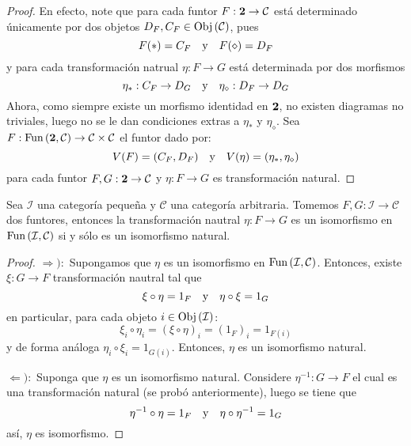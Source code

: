 \documentclass[12pt]{report}
\newcounter{it}
\theoremstyle{largebreak}
\newcommand\cf[3]{\ensuremath{#1:#2\rightarrow#3}}
\newcommand{\Obj}[1]{\ensuremath{\textup{Obj}\left(#1\right)}}
\newcommand{\Cat}[1]{\ensuremath{\textup{\textbf{#1}}}}
\newcommand{\Fun}[2]{\ensuremath{\textup{Fun}\left(#1,#2\right)}}
\begin{document}
    \begin{proof}
        En efecto, note que para cada funtor $\cf{F}{\Cat{2}}{\mathcal{C}}$ está determinado únicamente por dos objetos $D_F, C_F\in\Obj{\mathcal{C}}$, pues
        \begin{equation*}
            F(*)=C_F\quad\textup{y}\quad F(\diamond)=D_F
        \end{equation*}
        y para cada transformación natrual $\cf{\eta}{F}{G}$ está determinada por dos morfismos
        \begin{equation*}
            \cf{\eta_*}{C_F}{D_G}\quad\textup{y}\quad\cf{\eta_\diamond}{D_F}{D_G}
        \end{equation*}
        Ahora, como siempre existe un morfismo identidad en $\Cat{2}$, no existen diagramas no triviales, luego no se le dan condiciones extras a $\eta_*$ y $\eta_\diamond$. Sea $\cf{F}{\Fun{\Cat{2}}{\mathcal{C}}}{\mathcal{C}\times\mathcal{C}}$ el funtor dado por:
        \begin{equation*}
            V(F)=(C_F,D_F)\quad\textup{y}\quad V(\eta)=(\eta_*,\eta_\diamond)
        \end{equation*}
        para cada funtor $\cf{F,G}{\Cat{2}}{\mathcal{C}}$ y $\cf{\eta}{F}{G}$ es transformación natural.
    \end{proof}

    \begin{propo}
        Sea $\mathcal{I}$ una categoría pequeña y $\mathcal{C}$ una categoría arbitraria. Tomemos $\cf{F,G}{\mathcal{I}}{\mathcal{C}}$ dos funtores, entonces la transformación nautral $\cf{\eta}{F}{G}$ es un isomorfismo en $\Fun{\mathcal{I}}{\mathcal{C}}$ si y sólo es un isomorfismo natural.
    \end{propo}

    \begin{proof}
        $\Rightarrow):$ Supongamos que $\eta$ es un isomorfismo en $\Fun{\mathcal{I}}{\mathcal{C}}$. Entonces, existe $\cf{\xi}{G}{F}$ transformación nautral tal que
        \begin{equation*}
            \xi\circ\eta=1_F\quad\textup{y}\quad\eta\circ\xi=1_G
        \end{equation*}
        en particular, para cada objeto $i\in\Obj{\mathcal{I}}$:
        \begin{equation*}
            \xi_i\circ\eta_i=(\xi\circ\eta)_i=(1_F)_i=1_{F(i)}
        \end{equation*}
        y de forma análoga $\eta_i\circ\xi_i=1_{G(i)}$. Entonces, $\eta$ es un isomorfismo natural.

        $\Leftarrow):$ Suponga que $\eta$ es un isomorfismo natural. Considere $\cf{\eta^{-1}}{G}{F}$ el cual es una transformación natural (se probó anteriormente), luego se tiene que
        \begin{equation*}
            \eta^{-1}\circ\eta=1_F\quad\textup{y}\quad\eta\circ\eta^{-1}=1_G
        \end{equation*}
        así, $\eta$ es isomorfismo.
    \end{proof}
\end{document}
